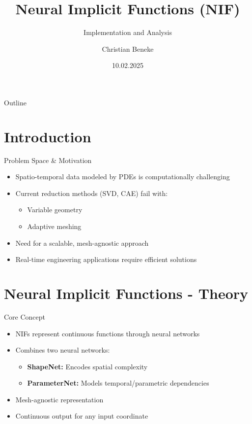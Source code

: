\documentclass{beamer}
\title{Neural Implicit Functions (NIF)}
\subtitle{Implementation and Analysis}
\author{Christian Beneke}
\date{10.02.2025}
\begin{document}
\begin{frame}
    \titlepage
\end{frame}

\begin{frame}{Outline}
    \tableofcontents
\end{frame}

\section{Introduction}
\begin{frame}{Problem Space \& Motivation}
    \begin{itemize}
        \item Spatio-temporal data modeled by PDEs is computationally challenging
        \item Current reduction methods (SVD, CAE) fail with:
        \begin{itemize}
            \item Variable geometry
            \item Adaptive meshing
        \end{itemize}
        \item Need for a scalable, mesh-agnostic approach
        \item Real-time engineering applications require efficient solutions
    \end{itemize}
\end{frame}

\section{Neural Implicit Functions - Theory}
\begin{frame}{Core Concept}
    \begin{itemize}
        \item NIFs represent continuous functions through neural networks
        \item Combines two neural networks:
        \begin{itemize}
            \item \textbf{ShapeNet:} Encodes spatial complexity
            \item \textbf{ParameterNet:} Models temporal/parametric dependencies
        \end{itemize}
        \item Mesh-agnostic representation
        \item Continuous output for any input coordinate
    \end{itemize}
\end{frame}
\end{document}
